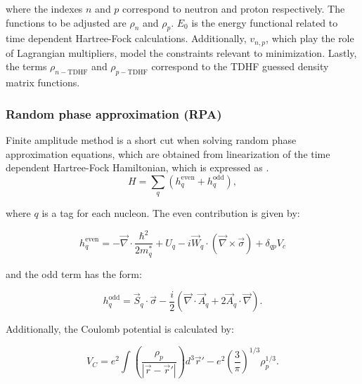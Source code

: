 \documentclass[openany]{book}
\begin{document}
where the indexes $n$ and $p$ correspond to neutron and proton respectively. The functions to be adjusted are $\rho_n$ and $\rho_p$. $E_0$ is the energy functional related to time dependent Hartree-Fock calculations. Additionally, $v_{n,p}$, which play the role of Lagrangian multipliers, model the constraints relevant to minimization. Lastly, the terms $\rho_{n-\mathrm{TDHF}}$ and  $\rho_{p-\mathrm{TDHF}}$ correspond to the TDHF guessed density matrix functions.

\subsubsection{Random phase approximation (RPA)} \label{ssub:micro_RPA}

Finite amplitude method is a short cut when solving random phase approximation equations, which are obtained from linearization of the time dependent Hartree-Fock Hamiltonian, which is expressed as  \cite{sasaki_kawano_stetcu_2022}. \\

\begin{equation}\label{eq:micro_RPA_singleHamiltonian}
	H = \sum_{q} (h^{\mathrm{even}}_q + h^{\mathrm{odd}}_q),
\end{equation}

where $q$ is a tag for each nucleon. The even contribution is given by:

\begin{equation}\label{eq:micro_RPA_singleHamiltonian_even}
	h^{\mathrm{even}}_q = - \vec \nabla \cdot \frac{\hbar^2}{2m^{*}_q} + U_q - i \vec W_q \cdot (\vec \nabla \times \vec \sigma) + \delta_{qp} V_c
\end{equation} 

and the odd term has the form:

\begin{equation}\label{eq:micro_RPA_singleHamiltonian_odd}
	h^{\mathrm{odd}}_q = \vec S_q \cdot \vec \sigma - \frac{i}{2} (\vec \nabla \cdot \vec A_q + 2 \vec A_q \cdot \vec \nabla).
\end{equation} 

Additionally, the Coulomb potential is calculated by: 

\begin{equation}\label{eq:micro_RPA_coulomb}
	V_{C} = e^2 \int { \left( \frac{\rho_p}{|\vec r - \vec r'|} \right) d^3\vec r' } - e^2 \left(\frac{3}{\pi}\right)^{1/3}\rho^{1/3}_p.
\end{equation} 
\end{document}
